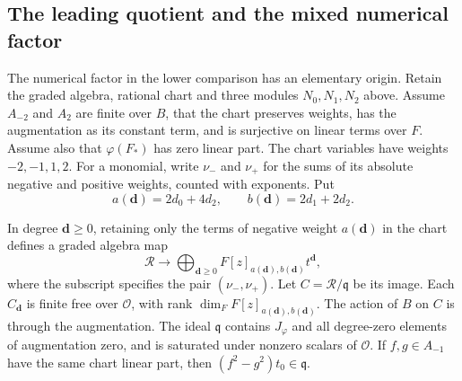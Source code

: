 \subsection{The leading quotient and the mixed numerical factor}
\label{subsec:selmer-mixed-count}

The numerical factor in the lower comparison has an elementary origin.
Retain the graded algebra, rational chart and three modules
$N_0,N_1,N_2$ above. Assume $A_{-2}$ and $A_2$ are finite over $B$, that
the chart preserves weights, has the augmentation as its constant term,
and is surjective on linear terms over $F$. Assume also that
$\varphi(F_*)$ has zero linear part. The chart variables have weights
$-2,-1,1,2$.
For a monomial, write $\nu_-$ and $\nu_+$ for the sums of its absolute
negative and positive weights, counted with exponents. Put
\[
 a(\boldsymbol d)=2d_0+4d_2,\qquad b(\boldsymbol d)=2d_1+2d_2.
\]

\begin{lemma}
\label{lem:selmer-leading-piece}
In degree $\boldsymbol d\ge0$, retaining only the terms of negative
weight $a(\boldsymbol d)$ in the chart defines a graded algebra map
\[
 \mathcal R\longrightarrow
 \bigoplus_{\boldsymbol d\ge0}
 F[z]_{a(\boldsymbol d),b(\boldsymbol d)}t^{\boldsymbol d},
\]
where the subscript specifies the pair $(\nu_-,\nu_+)$. Let
$C=\mathcal R/\mathfrak q$ be its image. Each $C_{\boldsymbol d}$ is
finite free over $\mathcal O$, with rank
$\dim_F F[z]_{a(\boldsymbol d),b(\boldsymbol d)}$.
The action of $B$ on $C$ is through the augmentation. The ideal
$\mathfrak q$ contains $J_\varphi$ and all degree-zero elements of
augmentation zero, and is saturated under nonzero scalars of
$\mathcal O$. If $f,g\in A_{-1}$ have the same chart linear part, then
$(f^2-g^2)t_0\in\mathfrak q$.
\end{lemma}

